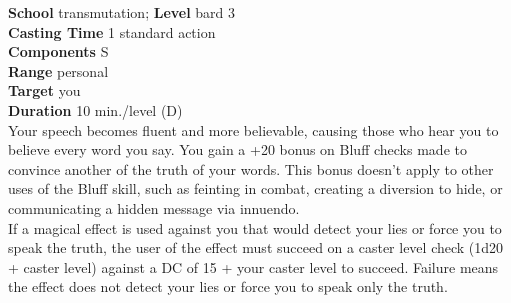 \textbf{School} transmutation; \textbf{Level} bard 3\\
\textbf{Casting Time} 1 standard action\\
\textbf{Components} S\\
\textbf{Range} personal\\
\textbf{Target} you\\
\textbf{Duration} 10 min./level (D)\\
Your speech becomes fluent and more believable, causing those who hear you to believe every word you say. You gain a +20 bonus on Bluff checks made to convince another of the truth of your words. This bonus doesn't apply to other uses of the Bluff skill, such as feinting in combat, creating a diversion to hide, or communicating a hidden message via innuendo.\\
If a magical effect is used against you that would detect your lies or force you to speak the truth, the user of the effect must succeed on a caster level check (1d20 + caster level) against a DC of 15 + your caster level to succeed. Failure means the effect does not detect your lies or force you to speak only the truth.\\
